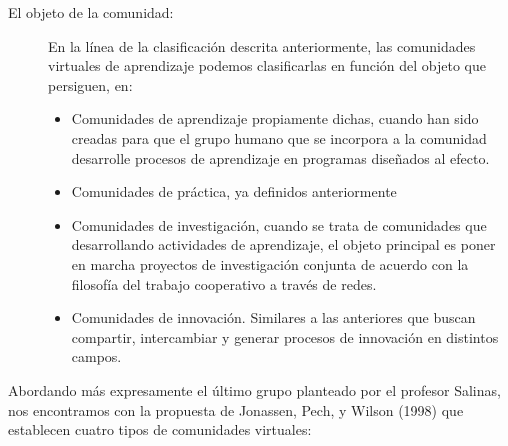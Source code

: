 \begin{description}
\item[El objeto de la comunidad: ] 
En la línea de la clasificación descrita anteriormente, las comunidades virtuales de aprendizaje podemos clasificarlas en función del objeto que persiguen, en:

\begin{itemize}
\item Comunidades de aprendizaje propiamente dichas, cuando han sido creadas para que el grupo humano que se incorpora a la comunidad desarrolle procesos de aprendizaje en programas diseñados al efecto.
\item Comunidades de práctica, ya definidos anteriormente
\item Comunidades de investigación, cuando se trata de comunidades que desarrollando actividades de aprendizaje, el objeto principal es poner en marcha proyectos de investigación conjunta de acuerdo con la filosofía del trabajo cooperativo a través de redes.
\item Comunidades de innovación. Similares a las anteriores que buscan compartir, intercambiar y generar procesos de innovación en distintos campos.
\end{itemize}

\end{description}


Abordando más expresamente el último grupo planteado por el profesor Salinas, nos encontramos con la propuesta de Jonassen, Pech, y Wilson (1998) que establecen cuatro tipos de comunidades virtuales:

